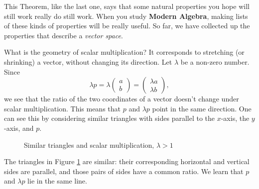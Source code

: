 \documentclass[elementsmain.tex]{subfiles}
\begin{document}
This Theorem, like the last one, says that some natural properties you hope will still work really do still work. When you study \textbf{Modern Algebra}, making lists of these kinds of properties will be really useful. So far, we have collected up the properties that describe a \emph{vector space}.


What is the geometry of scalar multiplication?
It corresponds to stretching (or shrinking) a vector, without changing its direction.
Let $\lambda$ be a non-zero number. Since
\[
\lambda p = \lambda \begin{pmatrix} a \\ b \end{pmatrix} = \begin{pmatrix} \lambda a \\ \lambda b\end{pmatrix},
\]
we see that the ratio of the two coordinates of a vector doesn't change under scalar multiplication. This means that $p$ and $\lambda p$ point in the same direction.
One can see this by considering similar triangles with sides parallel to the $x$-axis, the $y$-axis, and $p$.

\begin{figure}[h!]
\centering
{}
\caption{Similar triangles and scalar multiplication, $\lambda >1$}
\label{fig:sim-tri}
\end{figure}

The triangles in Figure \ref{fig:sim-tri} are similar: their corresponding horizontal and vertical sides are parallel, and those pairs of sides have a common ratio.
We learn that $p$ and $\lambda p$ lie in the same line.
\end{document}
